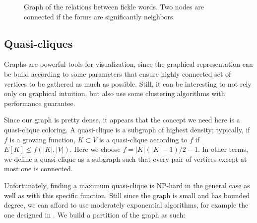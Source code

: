 \documentclass[runningheads,a4paper]{llncs}
\begin{document}
\begin{figure}[h!]

\caption{Graph of the relations between fickle words. Two nodes are connected if the forms are significantly neighbors.}
\label{fig:graph1}
\end{figure}

\subsection{Quasi-cliques}

Graphs are powerful tools for visualization, since the graphical representation can be build according to some parameters that ensure highly connected set of vertices to be gathered as much as possible. Still, it can be interesting to not rely only on graphical intuition, but also use some clustering algorithms with performance guarantee.

Since our graph is pretty dense, it appears that the concept we need here is a quasi-clique coloring. A quasi-clique is a subgraph of highest density; typically, if $f$ is a growing function, $K \subset V$ is a quasi-clique according to $f$ if $E[K] \leq f(|K|,|V|)$. Here we choose $f=|K|(|K|-1)/2-1$. In other terms, we define a quasi-clique as a subgraph such that every pair of vertices except at most one is connected.

Unfortunately, finding a maximum quasi-clique is NP-hard in the general case as well as with this specific function. Still since the graph is small and has bounded degree, we can afford to use moderately exponential algorithms, for example the one designed in \cite{qis}. We build a partition of the graph as such:
\end{document}
